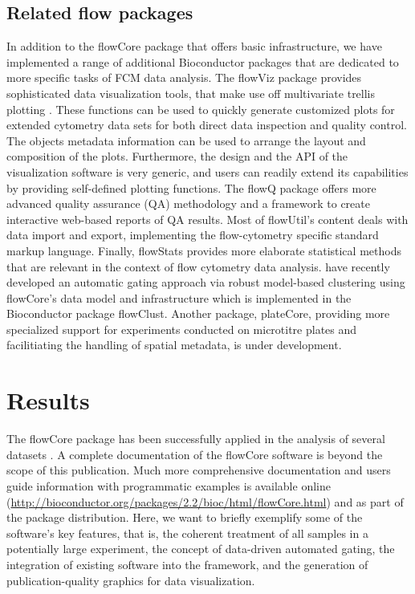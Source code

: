\documentclass[12pt]{article}
\newcommand{\Rpackage}[1]{{\textsf{#1}}}
\begin{document}
\subsection*{Related flow packages}

In addition to the \Rpackage{flowCore} package that offers basic
infrastructure, we have implemented a range of additional Bioconductor
packages that are dedicated to more specific tasks of FCM data
analysis. The \Rpackage{flowViz} package \citep{sarkar2008ufv}
provides sophisticated data visualization tools, that make use off
multivariate trellis plotting \citep{lattice}.  These functions can be
used to quickly generate customized plots for extended cytometry data
sets for both direct data inspection and quality control.  The objects
metadata information can be used to arrange the layout and composition
of the plots.  Furthermore, the design and the API of the
visualization software is very generic, and users can readily extend
its capabilities by providing self-defined plotting functions.  The
\Rpackage{flowQ} package offers more advanced quality assurance (QA)
methodology and a framework to create interactive web-based reports of
QA results.  Most of \Rpackage{flowUtil}'s content deals with data
import and export, implementing the flow-cytometry specific standard
markup language.  Finally, \Rpackage{flowStats} provides more
elaborate statistical methods that are relevant in the context of flow
cytometry data analysis. \cite{lo2008agf} have recently developed an
automatic gating approach via robust model-based clustering using
\Rpackage{flowCore}'s data model and infrastructure which is
implemented in the Bioconductor package \Rpackage{flowClust}. Another
package, \Rpackage{plateCore}, providing more specialized support for
experiments conducted on microtitre plates and facilitiating the
handling of spatial metadata, is under development.

\section*{Results}
The \Rpackage{flowCore} package has been successfully applied in the
analysis of several datasets
\citep{gasparetto2004ice,brinkman2007hcf}. A complete documentation of
the \Rpackage{flowCore} software is beyond the scope of this
publication.  Much more comprehensive documentation and users guide
information with programmatic examples is available online
(\url{http://bioconductor.org/packages/2.2/bioc/html/flowCore.html})
and as part of the package distribution. Here, we want to briefly
exemplify some of the software's key features, that is, the coherent
treatment of all samples in a potentially large experiment, the
concept of data-driven automated gating, the integration of existing
software into the framework, and the generation of publication-quality
graphics for data visualization.
\end{document}
